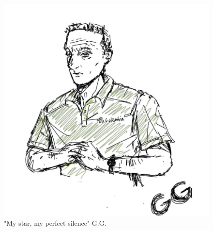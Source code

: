 \documentclass[11pt]{article}
\begin{document}
    \maketitle
    
    \begin{figure}[h!]
        \centering
        \includegraphics[width=0.5\linewidth]{img/Gigi}
        \caption*{"My star, my perfect silence" G.G.}
    \end{figure}
	\tableofcontents
	\newpage	
	
	

	

	

	
	
     
    
	
    
    
\end{document}

